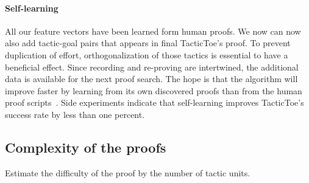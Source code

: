 \documentclass[runningheads,a4paper,draft]{svjour3}
\def\tactictoe{\textsf{TacticToe}\xspace}
\begin{document}

\paragraph{Self-learning}
All our feature vectors have been learned form human proofs. We now can now 
also add tactic-goal pairs that appears in final \tactictoe's proof. To prevent 
duplication of effort, orthogonalization of those 
tactics is essential to have a beneficial effect.
Since recording and re-proving are intertwined, the additional data is 
available for the next proof search.
The hope is that the algorithm will improve faster by learning from its own 
discovered proofs than from the human proof 
scripts~\cite{DBLP:conf/cade/Urban07}. Side experiments indicate that 
self-learning improves \tactictoe's success rate by less than one percent.


\subsection{Complexity of the proofs}


Estimate the difficulty of the proof by the number of tactic units.
\end{document}
